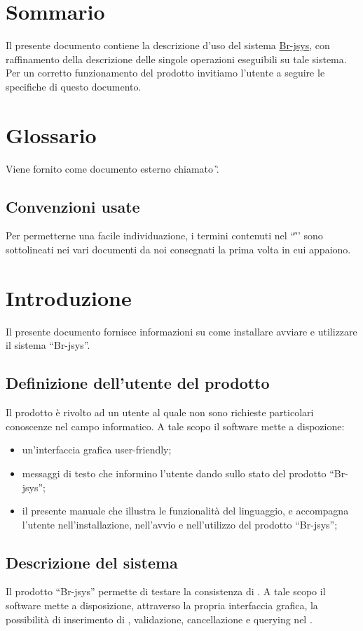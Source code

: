 \tableofcontents 
\chapter*{Sommario}
Il presente documento contiene la descrizione d'uso del sistema \underline{Br-jsys}, con raffinamento della descrizione delle singole operazioni eseguibili su tale sistema. Per un corretto funzionamento del prodotto invitiamo l'utente a seguire le specifiche di questo documento.

\chapter*{Glossario}
Viene fornito come documento esterno chiamato \G. 
\section*{Convenzioni usate}
Per permetterne una facile individuazione, i termini contenuti nel ``\G'' sono sottolineati nei vari documenti da noi consegnati la prima volta in cui appaiono.

\chapter{Introduzione}
Il presente documento fornisce informazioni su come installare avviare e utilizzare il sistema ``Br-jsys''.
\section{Definizione dell'utente del prodotto}
Il prodotto \`e rivolto ad un utente al quale non sono richieste particolari conoscenze nel campo informatico. A tale scopo il software mette a dispozione:
\begin{itemize}
\item un'interfaccia grafica user-friendly;
\item messaggi di testo che informino l'utente dando sullo stato del prodotto ``Br-jsys'';
\item il presente manuale che illustra le funzionalit\`a del linguaggio, e accompagna l'utente nell'installazione, nell'avvio e nell'utilizzo del prodotto ``Br-jsys'';
\end{itemize}

\section{Descrizione del sistema}
Il prodotto ``Br-jsys'' permette di testare la consistenza di \underline{\bo}. A tale scopo il software mette a disposizione, attraverso la propria interfaccia grafica, la possibilit\`a di inserimento di \br,  validazione, cancellazione e querying nel \underline{\rp}.

